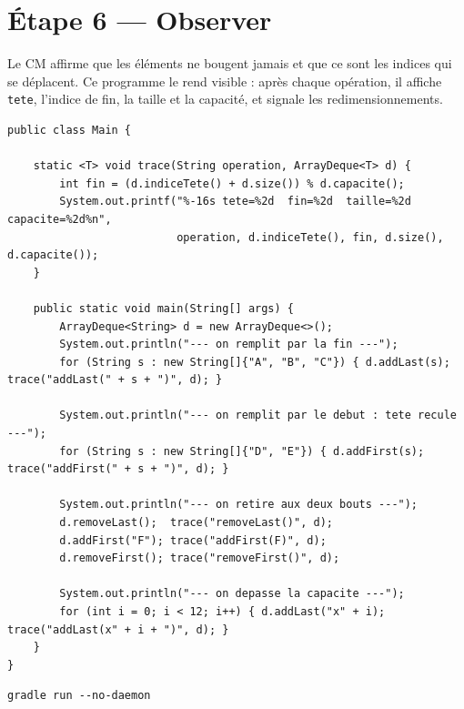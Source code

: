 \documentclass[11pt,a4paper]{article}
\begin{document}
\section{Étape 6 --- Observer}

\begin{lienbox}[Ce qu'on matérialise du CM]
Le CM affirme que les éléments ne bougent jamais et que ce sont les indices
qui se déplacent. Ce programme le rend visible : après chaque opération, il
affiche \texttt{tete}, l'indice de fin, la taille et la capacité, et signale
les redimensionnements.
\end{lienbox}

\begin{lstlisting}[caption={\texttt{Main.java} --- programme d'observation}]
public class Main {

    static <T> void trace(String operation, ArrayDeque<T> d) {
        int fin = (d.indiceTete() + d.size()) % d.capacite();
        System.out.printf("%-16s tete=%2d  fin=%2d  taille=%2d  capacite=%2d%n",
                          operation, d.indiceTete(), fin, d.size(), d.capacite());
    }

    public static void main(String[] args) {
        ArrayDeque<String> d = new ArrayDeque<>();
        System.out.println("--- on remplit par la fin ---");
        for (String s : new String[]{"A", "B", "C"}) { d.addLast(s); trace("addLast(" + s + ")", d); }

        System.out.println("--- on remplit par le debut : tete recule ---");
        for (String s : new String[]{"D", "E"}) { d.addFirst(s); trace("addFirst(" + s + ")", d); }

        System.out.println("--- on retire aux deux bouts ---");
        d.removeLast();  trace("removeLast()", d);
        d.addFirst("F"); trace("addFirst(F)", d);
        d.removeFirst(); trace("removeFirst()", d);

        System.out.println("--- on depasse la capacite ---");
        for (int i = 0; i < 12; i++) { d.addLast("x" + i); trace("addLast(x" + i + ")", d); }
    }
}
\end{lstlisting}

\begin{lstlisting}[style=bash,caption={Exécuter}]
gradle run --no-daemon
\end{lstlisting}
\end{document}
